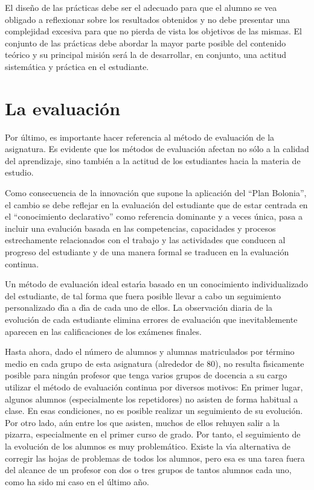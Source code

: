 El dise\~{n}o de las pr\'{a}cticas debe ser el adecuado para que
 el alumno se vea obligado a reflexionar sobre los resultados 
obtenidos y no debe presentar una complejidad excesiva para 
que no pierda de vista los objetivos de las mismas. El conjunto
 de las pr\'{a}cticas debe abordar la mayor parte posible del
 contenido te\'{o}rico y su principal misi\'{o}n ser\'{a} la de 
desarrollar, en conjunto, una actitud sistem\'{a}tica y pr\'{a}ctica
 en el estudiante.



\newpage
\section{La evaluaci\'{o}n} \label{PD-evaluacion}
Por  \'{u}ltimo, es importante hacer referencia al m\'{e}todo de 
evaluaci\'{o}n de la asignatura. Es evidente que los 
m\'{e}todos de evaluaci\'{o}n afectan no s\'{o}lo a la calidad del 
aprendizaje, sino tambi\'{e}n a la actitud de los estudiantes hacia la materia
 de estudio.

Como consecuencia de la innovaci\'{o}n que supone la aplicaci\'{o}n del
``Plan Bolonia'', el cambio se debe reflejar en la {  evaluaci\'{o}n}
del estudiante que de estar centrada en el ``conocimiento declarativo'' como
referencia dominante y a veces \'{u}nica, pasa a incluir una evaluci\'{o}n
basada en las competencias, capacidades y procesos estrechamente relacionados
con el trabajo y las actividades que conducen al progreso del estudiante
y de una manera formal se traducen en la {  evaluaci\'{o}n continua}.

 Un m\'{e}todo de evaluaci\'{o}n ideal estar\'{\i}a basado en un
 conocimiento individualizado del estudiante, de tal forma que fuera 
posible llevar a cabo un seguimiento personalizado  
d\'{\i}a a d\'{\i}a de cada uno de ellos.
 La observaci\'{o}n diaria de la evoluci\'{o}n de cada estudiante 
elimina errores de evaluaci\'{o}n que inevitablemente
 aparecen en las calificaciones de los ex\'{a}menes finales.

Hasta ahora, 
dado el n\'{u}mero de alumnos y alumnas matriculados por t\'{e}rmino medio
en cada grupo de esta asignatura (alrededor de 80),
 no resulta f\'{\i}sicamente posible para ning\'{u}n profesor que tenga
varios grupos de docencia a su cargo
utilizar el  m\'{e}todo de  evaluaci\'{o}n continua por diversos motivos:
En primer lugar, algunos alumnos (especialmente 
los repetidores) no asisten de
forma habitual a clase. En esas condiciones, no es posible
realizar un seguimiento de su evoluci\'{o}n. Por otro lado, a\'{u}n entre
los que asisten, muchos de ellos rehuyen  salir a la pizarra,  
 especialmente en el primer curso de grado.
Por tanto, el seguimiento de la evoluci\'{o}n de los alumnos es muy
problem\'{a}tico.  Existe la v\'\i a alternativa de corregir las 
hojas de problemas de todos los alumnos, pero
esa es una tarea fuera del alcance de un profesor con  dos o
tres grupos
de  tantos alumnos cada uno, como ha sido mi caso en el \'{u}ltimo a\~{n}o.

